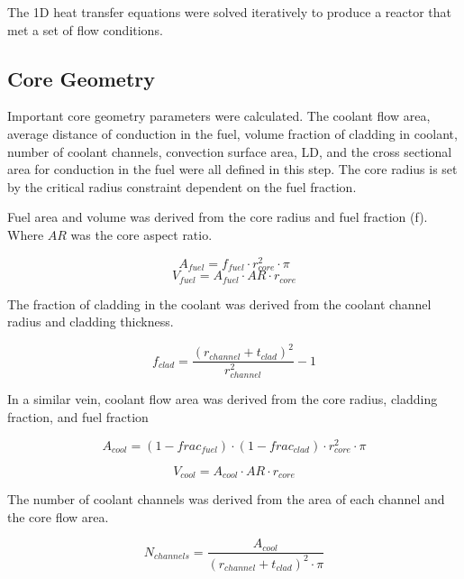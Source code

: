 The 1D heat transfer equations were solved iteratively to produce a reactor that
met a set of flow conditions.

\subsection{Core Geometry}
Important core geometry parameters were calculated. The coolant flow area,
average distance of conduction in the fuel, volume fraction of cladding in
coolant, number of coolant channels, convection surface area, LD, and the cross
sectional area for conduction in the fuel were all defined in this step. The
core radius is set by the critical
radius constraint dependent on the fuel fraction.

Fuel area and volume was derived from the core radius and fuel fraction (f). Where
$AR$ was the core aspect ratio.

\begin{equation}
    A_{fuel} = f_{fuel}\cdot r_{core}^2 \cdot \pi
\end{equation}
\begin{equation}
    V_{fuel} = A_{fuel}\cdot AR\cdot r_{core}
\end{equation}

The fraction of cladding in the coolant was derived from the coolant channel
radius and cladding thickness.

\begin{equation}
    f_{clad} = \frac{(r_{channel} + t_{clad})^2}{r_{channel}^2} - 1 
\end{equation}

In a similar vein, coolant flow area was derived from the core radius, cladding
fraction, and fuel fraction

\begin{equation}
    A_{cool} = (1-frac_{fuel})\cdot (1-frac_{clad}) \cdot r_{core}^2 \cdot \pi
\end{equation}

\begin{equation}
    V_{cool} = A_{cool}\cdot AR\cdot r_{core}
\end{equation}

The number of coolant channels was derived from the area of each channel and the
core flow area.

\begin{equation}
    N_{channels} = \frac{A_{cool}}{(r_{channel} + t_{clad})^2 \cdot \pi}
\end{equation}

